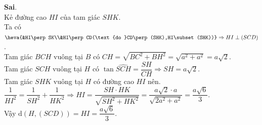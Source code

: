 \begin{ex}
{\begin{itemchoice}
   \itemch \textbf{Sai}.\\ 
   Kẻ đường cao $HI$ của tam  giác $SHK$.\\
   Ta có $\heva{&HI\perp  SK\\&HI\perp CD(\text{do }CD\perp (SHK),HI\subset (SHK))}\Rightarrow HI\perp (SCD)$.\\
   Tam giác  $BCH$ vuông tại $B$ có
    $CH=\sqrt{BC^2+BH^2}=\sqrt{a^2+a^2}=a\sqrt{2}$.\\
   Tam giác $SCH$ vuông  tại $H$ có
   $\tan\widehat{SCH}=\dfrac{SH}{CH}\Rightarrow  SH=a\sqrt{2}$.\\
   Tam giác $SHK$ vuông tại $H$ có đường  cao $HI$ nên.\\
    $\dfrac{1}{HI^2}=\dfrac{1}{SH^2}+\dfrac{1}{HK^2}\Rightarrow HI=\dfrac{SH\cdot HK}{\sqrt{SH^2+HK^2}}=\dfrac{a\sqrt{2}\cdot a}{\sqrt{2a^2+a^2}}=\dfrac{a\sqrt{6}}{3}$.\\
   Vậy $\mathrm{d}(H,(SCD))=HI=\dfrac{a\sqrt{6}}{3}$. 
 \end{itemchoice}}
\end{ex}

